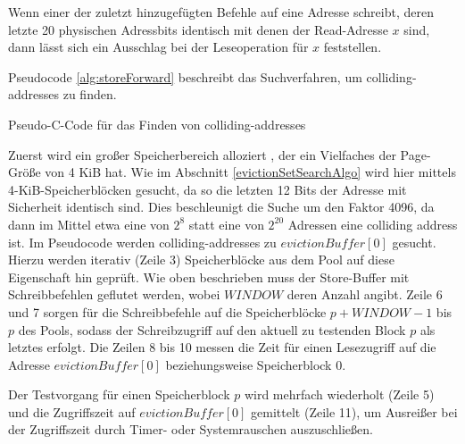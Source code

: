 Wenn einer der zuletzt hinzugefügten Befehle auf eine Adresse schreibt, deren letzte 20 physischen Adressbits identisch mit denen der Read-Adresse $x$ sind, dann lässt sich ein Ausschlag bei der Leseoperation für $x$ feststellen.

Pseudocode \ref{alg:storeForward} beschreibt das Suchverfahren, um colliding-addresses zu finden.

\begin{algorithm}[h]
\DontPrintSemicolon
\caption{Pseudo-C-Code für das Finden von colliding-addresses}
\label{alg:storeForward}

\end{algorithm}

Zuerst wird ein großer Speicherbereich alloziert %
, der ein Vielfaches der Page-Größe von 4 KiB hat.
Wie im Abschnitt \ref{evictionSetSearchAlgo} wird hier mittels 4-KiB-Speicherblöcken gesucht, da so die letzten 12 Bits der Adresse mit Sicherheit identisch sind.
Dies beschleunigt die Suche um den Faktor 4096, da dann im Mittel etwa eine von $2^8$ statt eine von $2^{20}$ Adressen eine colliding address ist.
Im Pseudocode werden colliding-addresses zu $evictionBuffer[0]$ gesucht.
Hierzu werden iterativ (Zeile 3) Speicherblöcke aus dem Pool auf diese Eigenschaft hin geprüft.
Wie oben beschrieben muss der Store-Buffer mit Schreibbefehlen geflutet werden, wobei $WINDOW$ deren Anzahl angibt.
Zeile 6 und 7 sorgen für die Schreibbefehle auf die Speicherblöcke $p + WINDOW - 1$ bis $p$ des Pools, sodass der Schreibzugriff auf den aktuell zu testenden Block $p$ als letztes erfolgt.
Die Zeilen 8 bis 10 messen die Zeit für einen Lesezugriff auf die Adresse $evictionBuffer[0]$ beziehungsweise Speicherblock 0.

Der Testvorgang für einen Speicherblock $p$ wird mehrfach wiederholt (Zeile 5) und die Zugriffszeit auf $evictionBuffer[0]$ gemittelt (Zeile 11), um Ausreißer bei der Zugriffszeit durch Timer- oder Systemrauschen auszuschließen. 

